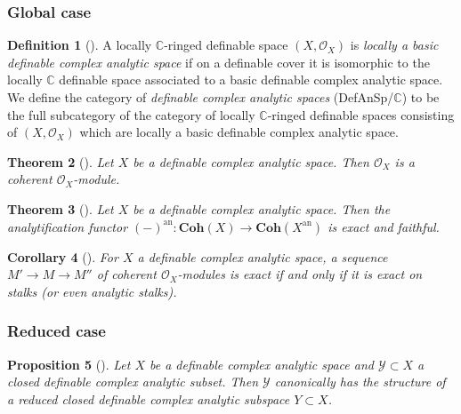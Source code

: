 \documentclass{amsart}
\newtheorem{theorem}{Theorem}[section]
\newtheorem{proposition}[theorem]{Proposition}
\newtheorem{corollary}[theorem]{Corollary}
\theoremstyle{definition}
\newtheorem{definition}[theorem]{Definition}
\numberwithin{equation}{section}
\newcommand{\analytic}{\mathrm{an}}
\begin{document}
\subsubsection{Global case}
\begin{definition}[{\cite[Definition 2.35]{zbMATH07662555}}]
    A locally $\mathbb{C}$-ringed definable space $(X,\mathcal{O}_X)$ is \emph{locally a basic definable complex analytic space}
    if on a definable cover it is isomorphic to the locally $\mathbb{C}$ definable space associated to a basic definable complex analytic space.
    We define the category of \emph{definable complex analytic spaces} (DefAnSp/$\mathbb{C}$) to be the full subcategory of the category of locally $\mathbb{C}$-ringed definable spaces consisting of $(X,\mathcal{O}_X)$ which are locally a basic definable complex analytic space.
\end{definition}

\begin{theorem}[{\cite[Theorem 2.38]{zbMATH07662555}}]
    Let $X$ be a definable complex analytic space.
    Then $\mathcal{O}_X$ is a coherent $\mathcal{O}_X$-module.
\end{theorem}

\begin{theorem}[{\cite[Theorem 2.39]{zbMATH07662555}}]
    Let $X$ be a definable complex analytic space.
    Then the analytification functor 
    $(-)^{\analytic}: \mathbf{Coh}(X) \to \mathbf{Coh}(X^{\analytic})$ is exact and faithful.
\end{theorem}

\begin{corollary}[{\cite[Corollary 2.40]{zbMATH07662555}}]
    For $X$ a definable complex analytic space,
    a sequence $M' \to M \to M''$ of coherent $\mathcal{O}_X$-modules
    is exact if and only if it is exact on stalks (or even analytic stalks).
\end{corollary}

\subsubsection{Reduced case}
\begin{proposition}[{\cite[Proposition 2.45]{zbMATH07662555}}]
    Let $X$ be a definable complex analytic space and 
    $\mathcal{Y} \subset X$ a closed definable complex analytic subset.
    Then $\mathcal{Y}$ canonically has the structure of a reduced closed definable complex analytic subspace $Y \subset X$.
\end{proposition}
\end{document}
